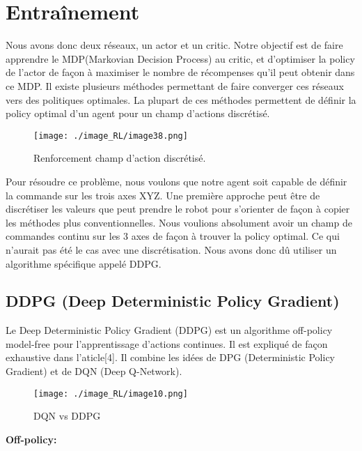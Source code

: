 \section{Entraînement}
Nous avons donc deux réseaux, un actor et un critic.
Notre objectif est de faire apprendre le MDP(Markovian Decision Process) au critic, et d’optimiser la policy de l’actor de façon à maximiser le nombre de récompenses qu’il peut obtenir dans ce MDP.
Il existe plusieurs méthodes permettant de faire converger ces réseaux vers des politiques optimales. 
La plupart de ces méthodes permettent de définir la policy optimal d’un agent pour un champ d’actions discrétisé.

\begin{figure}[H]
    \centering
    \texttt{[image: ./image\_RL/image38.png]}
    \caption{ Renforcement champ d’action discrétisé. }
\end{figure}

Pour résoudre ce problème, nous voulons que notre agent soit capable de définir la commande sur les trois axes XYZ. Une première approche peut être de discrétiser les valeurs que peut prendre le robot pour s’orienter de façon à copier les méthodes plus conventionnelles.
Nous voulions absolument avoir un champ de commandes continu sur les 3 axes de façon à trouver la policy optimal. Ce qui n’aurait pas été le cas avec une discrétisation.
Nous avons donc dû utiliser un algorithme spécifique appelé DDPG.

\subsection{DDPG (Deep Deterministic Policy Gradient)}
Le Deep Deterministic Policy Gradient (DDPG) est un algorithme off-policy model-free pour l'apprentissage d'actions continues.
Il est expliqué de façon exhaustive dans l’aticle[4].
Il combine les idées de DPG (Deterministic Policy Gradient) et de DQN (Deep Q-Network). 

\begin{figure}[H]
    \centering
    \texttt{[image: ./image\_RL/image10.png]}
    \caption{  DQN vs DDPG  }
\end{figure}

\textbf{Off-policy:}

